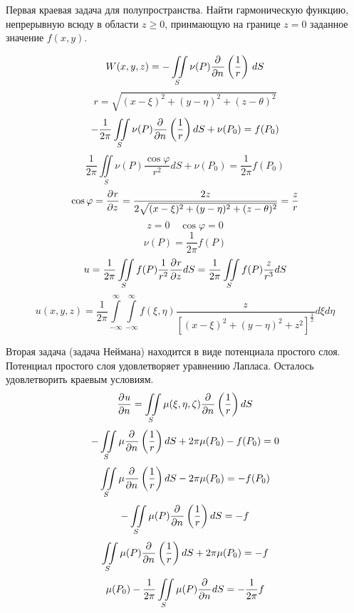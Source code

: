 \begin{example}{Первая краевая задача для полупространства.}
Найти гармоническую функцию, непрерывную всюду в области $z \geqslant 0$, принмающую на границе $z = 0$ заданное значение $f(x, y)$.

\[
	W(x, y, z) = - \iint\limits_S \nu (P) \frac{\partial^{}}{\partial n^{}} \left(\frac{1}{r} \right)\, dS
\]
\[
	r = \sqrt{(x - \xi)^2 + (y - \eta)^2 + (z - \theta)^2}
\]
\[
	-\frac{1}{2\pi} \iint\limits_S \nu(P) \frac{\partial^{}}{\partial n^{}} \left(\frac{1}{r}\right) dS + \nu (P_0) = f(P_0)
\]
\[
	\frac{1}{2 \pi} \iint\limits_S \nu(P) \frac{\cos \varphi}{r^2} dS + \nu (P_0) = \frac{1}{2 \pi} f(P_0)
\]
\[
	\cos \varphi = \frac{\partial^{}r}{\partial z^{}} = \frac{2 z}{2 \sqrt{(x - \xi)^2 + (y - \eta)^2 + (z - \theta)^2}} = \frac{z}{r}
\]
\[
	z = 0 \quad \cos \varphi = 0
\]
\[
	\nu(P) = \frac{1}{2 \pi} f(P)
\]
\[
	u = \frac{1}{2 \pi} \iint\limits_S f(P) \frac{1}{r^2} \frac{\partial^{}r}{\partial z^{}} dS = \frac{1}{2 \pi} \iint\limits_S f(P) \frac{z}{r^3} dS
\]
\[
	u(x, y, z) = \frac{1}{2 \pi} \int\limits_{-\infty}^{\infty}\int\limits_{-\infty}^{\infty} f(\xi, \eta) \frac{z}{[(x - \xi)^2 + (y - \eta)^2 + z^2]^{\frac{3}{2}}} d \xi d \eta
\]
\end{example}
Вторая задача (задача Неймана) находится в виде потенциала простого слоя.
Потенциал простого слоя удовлетворяет уравнению Лапласа. Осталось удовлетворить краевым условиям.
\[
	\frac{\partial^{}u}{\partial n^{}} = \iint\limits_S \mu(\xi, \eta, \zeta) \frac{\partial^{}}{\partial n^{}} \left(\frac{1}{r} \right) dS
\]
\[
	- \iint\limits_S \mu \frac{\partial^{}}{\partial n^{}} \left(\frac{1}{r} \right) dS + 2 \pi \mu(P_0) - f(P_0) = 0
\]
\[
	\iint\limits_S \mu \frac{\partial^{}}{\partial n^{}} \left(\frac{1}{r} \right) dS - 2 \pi \mu (P_0) = - f(P_0)
\]
\[
	- \iint\limits_S \mu (P) \frac{\partial^{}}{\partial n^{}} \left(\frac{1}{r} \right) dS = - f
\]
\[
	\iint\limits_S \mu (P) \frac{\partial^{}}{\partial n^{}} \left(\frac{1}{r} \right) dS + 2 \pi \mu (P_0) = -f 
\]
\[
	\mu(P_0) - \frac{1}{2 \pi} \iint\limits_S \mu(P) \frac{\partial^{}}{\partial n^{}} dS = - \frac{1}{2 \pi} f
\]






